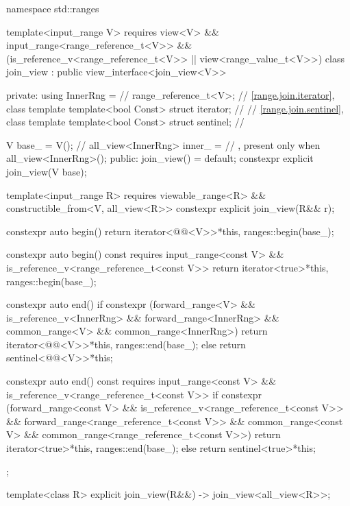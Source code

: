 %
\begin{codeblock}
namespace std::ranges {
  template<input_range V>
    requires view<V> && input_range<range_reference_t<V>> &&
             (is_reference_v<range_reference_t<V>> ||
              view<range_value_t<V>>)
  class join_view : public view_interface<join_view<V>> {
  private:
    using InnerRng =                    // \expos
      range_reference_t<V>;
    // \ref{range.join.iterator}, class template 
    template<bool Const>
      struct iterator;                  // \expos
    // \ref{range.join.sentinel}, class template 
    template<bool Const>
      struct sentinel;                  // \expos

    V base_ = V();                      // \expos
    all_view<InnerRng> inner_ =         // \expos, present only when 
      all_view<InnerRng>();
  public:
    join_view() = default;
    constexpr explicit join_view(V base);

    template<input_range R>
      requires viewable_range<R> && constructible_from<V, all_view<R>>
    constexpr explicit join_view(R&& r);

    constexpr auto begin() {
      return iterator<@@<V>>{*this, ranges::begin(base_)};
    }

    constexpr auto begin() const
    requires input_range<const V> &&
             is_reference_v<range_reference_t<const V>> {
      return iterator<true>{*this, ranges::begin(base_)};
    }

    constexpr auto end() {
      if constexpr (forward_range<V> &&
                    is_reference_v<InnerRng> && forward_range<InnerRng> &&
                    common_range<V> && common_range<InnerRng>)
        return iterator<@@<V>>{*this, ranges::end(base_)};
      else
        return sentinel<@@<V>>{*this};
    }

    constexpr auto end() const
    requires input_range<const V> &&
             is_reference_v<range_reference_t<const V>> {
      if constexpr (forward_range<const V> &&
                    is_reference_v<range_reference_t<const V>> &&
                    forward_range<range_reference_t<const V>> &&
                    common_range<const V> &&
                    common_range<range_reference_t<const V>>)
        return iterator<true>{*this, ranges::end(base_)};
      else
        return sentinel<true>{*this};
    }
  };

  template<class R>
    explicit join_view(R&&) -> join_view<all_view<R>>;
}
\end{codeblock}

